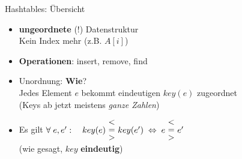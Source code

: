 \begin{frame}{Hashtables: Übersicht}
	\begin{itemize}
			\item \textbf{ungeordnete} (!) Datenstruktur \\
			\impl Kein Index mehr (z.B. $A[i]$) 
			\pause
			\item \textbf{Operationen}: insert, remove, find
			\forcenewline \pause
			\item Unordnung: \textbf{Wie}? \\
			\impl Jedes Element $e$ bekommt eindeutigen $key(e)$ zugeordnet \\ (Keys ab jetzt meistens \textit{ganze Zahlen})
			\pause
			\item Es gilt
			$\forall\; e, e': \quad key(e) \ \stackedtight{< \\ = \\ >}\ key(e') \gdw e \ \stackedtight{< \\ = \\ >} \ e'$ \\ (wie gesagt, $key$ \textbf{eindeutig})
	\end{itemize} 
\end{frame}



